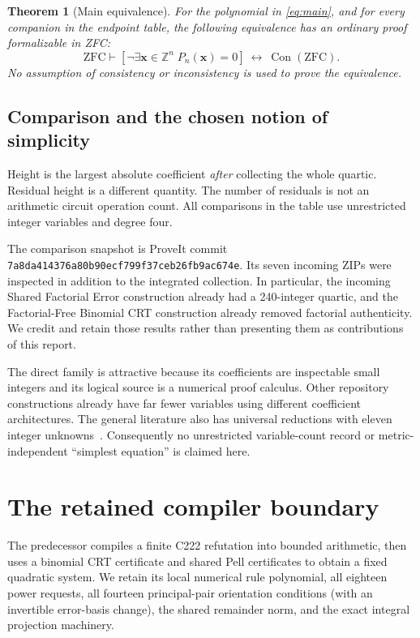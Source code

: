 \documentclass[11pt]{article}
\newtheorem{theorem}{Theorem}[section]
\theoremstyle{remark}\newtheorem{remark}[theorem]{Remark}
\newcommand{\Z}{\mathbb Z}\newcommand{\N}{\mathbb N}
\newcommand{\Con}{\operatorname{Con}}
\newcommand{\repo}{\texttt{7a8da414376a80b90ecf799f37ceb26fb9ac674e}}
\begin{document}
\begin{theorem}[Main equivalence]\label{thm:main}
For the polynomial in \eqref{eq:main}, and for every companion in the
endpoint table, the following equivalence has an ordinary proof
formalizable in ZFC:
\[
 \mathrm{ZFC}\vdash
 \left[\neg\exists\boldsymbol x\in\Z^n\;
 P_n(\boldsymbol x)=0\right]\ \longleftrightarrow\ \Con(\mathrm{ZFC}).
\]
No assumption of consistency or inconsistency is used to prove the
equivalence.
\end{theorem}

\subsection{Comparison and the chosen notion of simplicity}



Height is the largest absolute coefficient \emph{after} collecting the
whole quartic. Residual height is a different quantity. The number of
residuals is not an arithmetic circuit operation count. All comparisons in
the table use unrestricted integer variables and degree four.

The comparison snapshot is ProveIt commit \repo. Its seven incoming ZIPs
were inspected in addition to the integrated collection. In particular,
the incoming Shared Factorial Error construction already had a
240-integer quartic, and the Factorial-Free Binomial CRT construction
already removed factorial authenticity. We credit and retain those
results rather than presenting them as contributions of this report.

The direct family is attractive because its coefficients are inspectable
small integers and its logical source is a numerical proof calculus.
Other repository constructions already have far fewer variables using
different coefficient architectures. The general literature also has
universal reductions with eleven integer unknowns~\cite{bayer}.
Consequently no unrestricted variable-count record or metric-independent
``simplest equation'' is claimed here.

\section{The retained compiler boundary}

The predecessor compiles a finite C222 refutation into bounded arithmetic,
then uses a binomial CRT certificate and shared Pell certificates to
obtain a fixed quadratic system. We retain its local numerical rule
polynomial, all eighteen power requests, all fourteen principal-pair
orientation conditions (with an invertible error-basis change), the shared remainder norm, and the exact integral
projection machinery.
\end{document}
